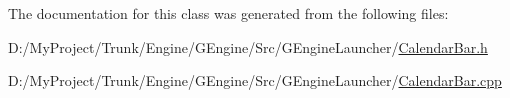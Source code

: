 The documentation for this class was generated from the following files\+:\begin{DoxyCompactItemize}
\item 
D\+:/\+My\+Project/\+Trunk/\+Engine/\+G\+Engine/\+Src/\+G\+Engine\+Launcher/\hyperlink{_calendar_bar_8h}{Calendar\+Bar.\+h}\item 
D\+:/\+My\+Project/\+Trunk/\+Engine/\+G\+Engine/\+Src/\+G\+Engine\+Launcher/\hyperlink{_calendar_bar_8cpp}{Calendar\+Bar.\+cpp}\end{DoxyCompactItemize}
